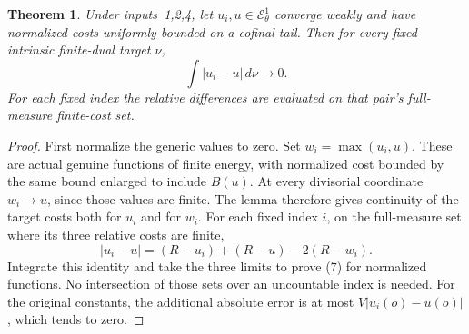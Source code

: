 \documentclass[11pt]{article}
\newtheorem{theorem}{Theorem}
\newcommand{\EE}{\mathcal E^1_\theta}
\begin{document}
\begin{theorem}
Under inputs~1,2,4, let $u_i,u\in\EE$ converge weakly
and have normalized costs uniformly bounded on a cofinal tail.
Then for every fixed intrinsic finite-dual target $\nu$,
\[
                       \int|u_i-u|\,d\nu\longrightarrow0. \tag{7}
\]
For each fixed index the relative differences are evaluated
on that pair's full-measure finite-cost set.
\end{theorem}
\begin{proof}
First normalize the generic values to zero. Set
$w_i=\max(u_i,u)$. These are actual genuine functions of
finite energy, with normalized cost bounded by the same
bound enlarged to include $B(u)$. At every divisorial
coordinate $w_i\to u$, since those values are finite.
The lemma therefore gives continuity of the target costs
both for $u_i$ and for $w_i$. For each fixed index $i$,
on the full-measure set where its three relative costs are finite,
\[
 |u_i-u|=(R-u_i)+(R-u)-2(R-w_i).
\]
Integrate this identity and take the three limits to prove
(7) for normalized functions. No intersection of those sets
over an uncountable index is needed. For the original constants,
the additional absolute error is at most
$V|u_i(o)-u(o)|$, which tends to zero.
\end{proof}
\end{document}
